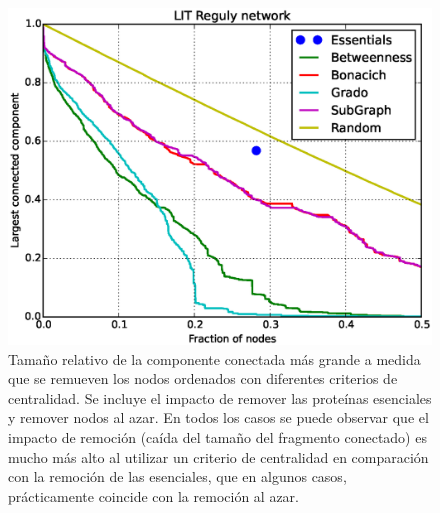 \begin{figure}
\includegraphics[scale = 0.3]{figuras/LIT_Reguly_b} 
\caption{Tamaño relativo de la componente conectada más grande a medida que se remueven los nodos ordenados con diferentes criterios de centralidad. Se incluye el impacto de remover las proteínas esenciales y remover nodos al azar. En todos los casos se puede observar que el impacto de remoción (caída del tamaño del fragmento conectado) es mucho más alto al utilizar un criterio de centralidad en comparación con la remoción de las esenciales, que en algunos casos, prácticamente coincide con la remoción al azar.}
\label{fig:remocion}
\end{figure}

